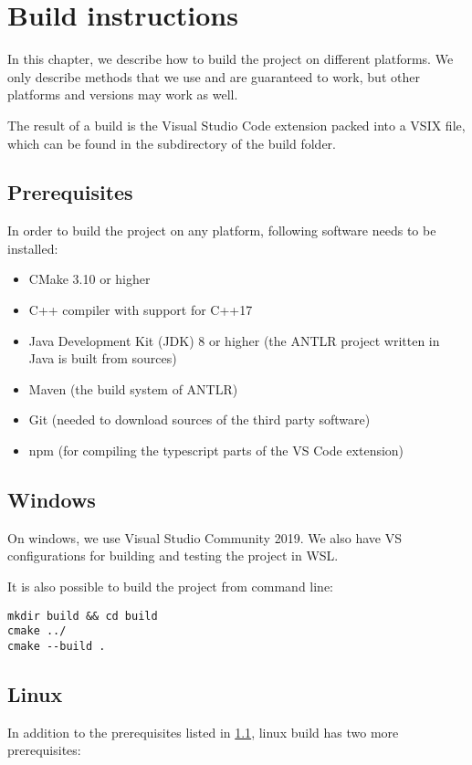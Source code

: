 \chapter{Build instructions}
\label{build}
In this chapter, we describe how to build the project on different platforms. We only describe methods that we use and are guaranteed to work, but other platforms and versions may work as well.

The result of a build is the Visual Studio Code extension packed into a VSIX file, which can be found in the  subdirectory of the build folder.

\section{Prerequisites}
\label{prereq}
In order to build the project on any platform, following software needs to be installed:

\begin{itemize}
	\item CMake 3.10 or higher
	\item C++ compiler with support for C++17
	\item Java Development Kit (JDK) 8 or higher (the ANTLR project written in Java is built from sources)
	\item Maven (the build system of ANTLR)
	\item Git (needed to download sources of the third party software)
	\item npm (for compiling the typescript parts of the VS Code extension)
\end{itemize}

\section{Windows}

On windows, we use Visual Studio Community 2019. We also have VS configurations for building and testing the project in WSL.

It is also possible to build the project from command line:
\begin{verbatim}
mkdir build && cd build
cmake ../
cmake --build .
\end{verbatim}

\section{Linux}

In addition to the prerequisites listed in \cref{prereq}, linux build has two more prerequisites:

